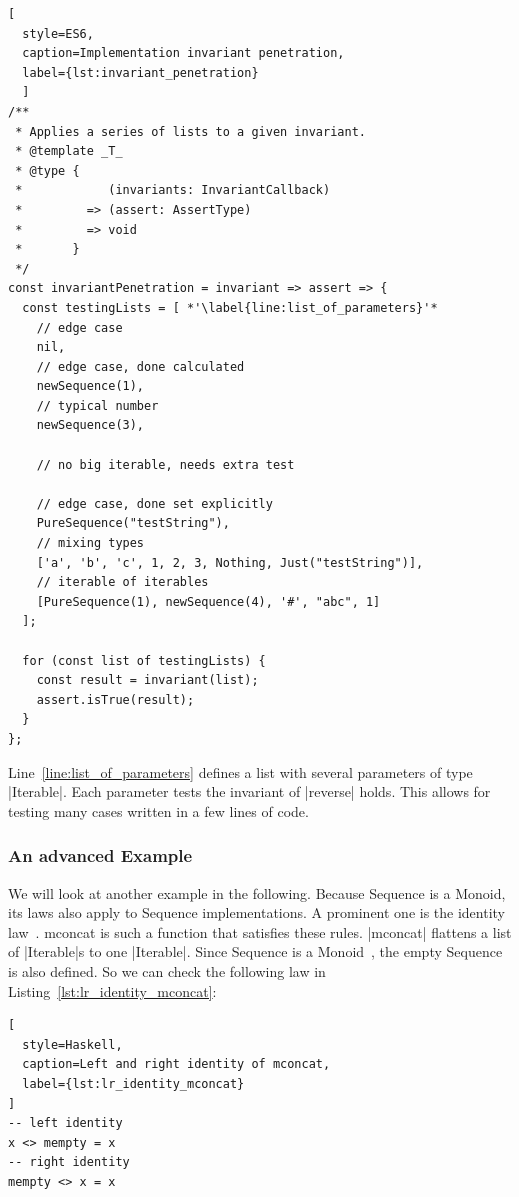 \begin{lstlisting}[
  style=ES6, 
  caption=Implementation invariant penetration,
  label={lst:invariant_penetration}
  ]
/**
 * Applies a series of lists to a given invariant.
 * @template _T_
 * @type {
 *            (invariants: InvariantCallback)
 *         => (assert: AssertType)
 *         => void
 *       }
 */
const invariantPenetration = invariant => assert => {
  const testingLists = [ *'\label{line:list_of_parameters}'*
    // edge case
    nil,                                                   
    // edge case, done calculated
    newSequence(1),                                        
    // typical number
    newSequence(3),                                        

    // no big iterable, needs extra test

    // edge case, done set explicitly
    PureSequence("testString"),                            
    // mixing types
    ['a', 'b', 'c', 1, 2, 3, Nothing, Just("testString")], 
    // iterable of iterables
    [PureSequence(1), newSequence(4), '#', "abc", 1]       
  ];

  for (const list of testingLists) {
    const result = invariant(list);
    assert.isTrue(result);
  }
};
\end{lstlisting}

Line~\ref{line:list_of_parameters} defines a list with several parameters of
type |Iterable|. Each parameter tests the invariant of |reverse| holds. 
This allows for testing many cases written in a few lines of code.

\subsubsection{An advanced Example}
\label{subsub:An advanced Example}
We will look at another example in the following. Because Sequence is a Monoid,
its laws also apply to Sequence implementations. A
prominent one is the identity law~\cite{quickcheck_hughes}. mconcat is such a function
that satisfies these rules. |mconcat| flattens a list of |Iterable|s to one
|Iterable|. Since Sequence is a Monoid~\cite{haskell_monoid}, the empty Sequence is also defined. So
we can check the following law in Listing~\ref{lst:lr_identity_mconcat}:

\begin{lstlisting}[
  style=Haskell,
  caption=Left and right identity of mconcat,
  label={lst:lr_identity_mconcat}
]
-- left identity
x <> mempty = x
-- right identity
mempty <> x = x
\end{lstlisting}

